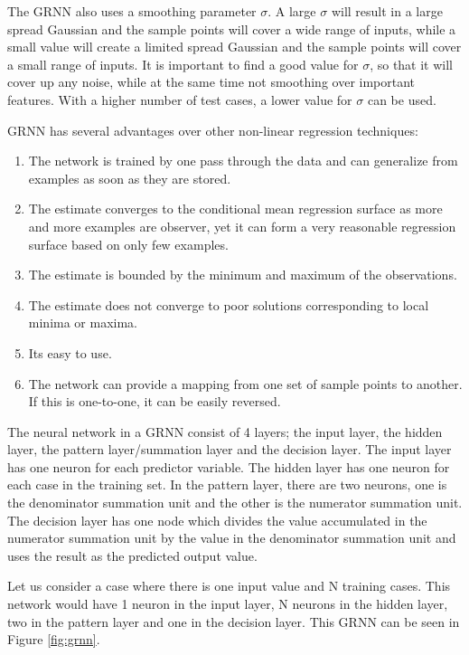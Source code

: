 \documentclass[12pt]{article}
\begin{document}
The GRNN also uses a smoothing parameter $\sigma$. A large $\sigma$ will result in a large spread Gaussian and the sample points will cover a wide range of inputs, while a small value will create a limited spread Gaussian and the sample points will cover a small range of inputs. It is important to find a good value for $\sigma$, so that it will cover up any noise, while at the same time not smoothing over important features. With a higher number of test cases, a lower value for $\sigma$ can be used. 

GRNN has several advantages over other non-linear regression techniques\cite{grnn}: 
\begin{enumerate}
\item The network is trained by one pass through the data and can generalize from examples as soon as they are stored.
\item The estimate converges to the conditional mean regression surface as more and more examples are observer, yet it can form a very reasonable regression surface based on only few examples.
\item The estimate is bounded by the minimum and maximum of the observations.
\item The estimate does not converge to poor solutions corresponding to local minima or maxima. 
\item Its easy to use.
\item The network can provide a mapping from one set of sample points to another. If this is one-to-one, it can be easily reversed. 
\end{enumerate}

The neural network in a GRNN consist of 4 layers; the input layer, the hidden layer, the pattern layer/summation layer and the decision layer. The input layer has one neuron for each predictor variable. The hidden layer has one neuron for each case in the training set. In the pattern layer, there are two neurons, one is the denominator summation unit and the other is the numerator summation unit. The decision layer has one node which divides the value accumulated in the numerator summation unit by the value in the denominator summation unit and uses the result as the predicted output value. 

Let us consider a case where there is one input value and N training cases. This network would have 1 neuron in the input layer, N neurons in the hidden layer, two in the pattern layer and one in the decision layer. This GRNN can be seen in Figure \ref{fig:grnn}.
\end{document}
